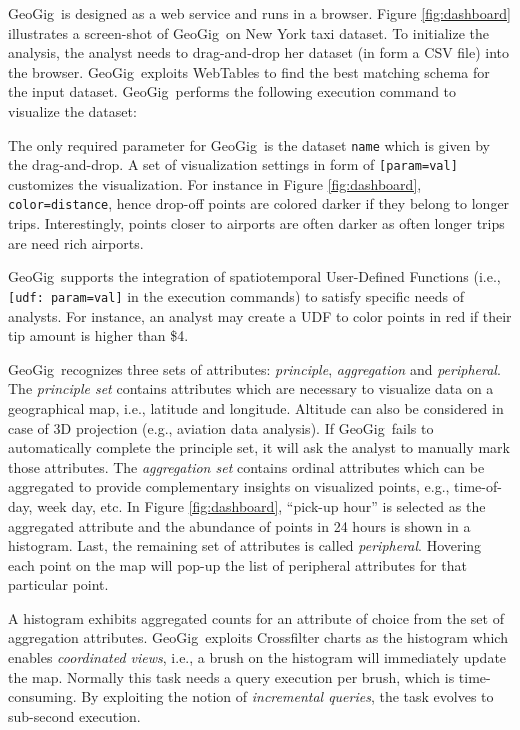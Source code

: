 \documentclass[conference]{IEEEtran}
\newcommand{\sys}{{\sc GeoGig}}
\begin{document}
\sys\ is designed as a web service and runs in a browser. Figure \ref{fig:dashboard} illustrates a screen-shot of \sys\ on New York taxi dataset. To initialize the analysis, the analyst needs to drag-and-drop her dataset (in form a CSV file) into the browser. \sys\ exploits {\sc WebTables} \cite{cafarella2008webtables} to find the best matching schema for the input dataset. \sys\ performs the following execution command to visualize the dataset:


The only required parameter for \sys\ is the dataset {\tt \small name} which is given by the drag-and-drop. A set of visualization settings in form of {\tt \small [param=val]} customizes the visualization. 
For instance in Figure \ref{fig:dashboard}, {\tt \small color=distance}, hence drop-off points are colored darker if they belong to longer trips. Interestingly, points closer to airports are often darker as often longer trips are need rich airports.

\sys\ supports the integration of spatiotemporal User-Defined Functions (i.e., {\tt \small [udf: param=val]} in the execution commands) to satisfy specific needs of analysts. For instance, an analyst may create a UDF to color points in red if their tip amount is higher than \$4.

\sys\ recognizes three sets of attributes: {\em principle}, {\em aggregation} and {\em peripheral}. The {\em principle set} contains attributes which are necessary to visualize data on a geographical map, i.e., latitude and longitude. Altitude can also be considered in case of 3D projection (e.g., aviation data analysis). If \sys\ fails to automatically complete the principle set, it will ask the analyst to manually mark those attributes. The {\em aggregation set} contains ordinal attributes which can be aggregated to provide complementary insights on visualized points, e.g., time-of-day, week day, etc. In Figure \ref{fig:dashboard}, ``pick-up hour'' is selected as the aggregated attribute and the abundance of points in 24 hours is shown in a histogram. Last, the remaining set of attributes is called {\em peripheral}. Hovering each point on the map will pop-up the list of peripheral attributes for that particular point.

A histogram exhibits aggregated counts for an attribute of choice from the set of aggregation attributes. \sys\ exploits Crossfilter charts \cite{cf} as the histogram which enables {\em coordinated views}, i.e., a brush on the histogram will immediately update the map. Normally this task needs a query execution per brush, which is time-consuming. By exploiting the notion of {\em incremental queries}, the task evolves to sub-second execution.
\end{document}
